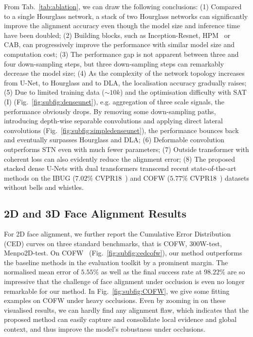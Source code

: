 \documentclass{bmvc2k}
\begin{document}
From Tab.~\ref{tab:ablation}, we can draw the following conclusions: (1) Compared to a single Hourglass network, a stack of two Hourglass networks can significantly improve the alignment accuracy even though the model size and inference time have been doubled; (2) Building blocks, such as Inception-Resnet, HPM~\cite{bulat2017far} or CAB, can progressively improve the performance with similar model size and computation cost; (3) The performance gap is not apparent between three and four down-sampling steps, but three down-sampling steps can remarkably decrease the model size; (4) As the complexity of the network topology increases from U-Net, to Hourglass and to DLA, the localisation accuracy gradually raises; (5) Due to limited training data ($\sim 10k$) and the optimisation difficulty with SAT (I) (Fig.~\ref{fig:subfig:denseunet}), e.g. aggregation of three scale signals, the performance obviously drops. By removing some down-sampling paths, introducing depth-wise separable convolutions and applying direct lateral convolutions (Fig.~\ref{fig:subfig:simpledenseunet}), the performance bounces back and eventually surpasses Hourglass and DLA; (6) Deformable convolution outperforms STN even with much fewer parameters; (7) Outside transformer with coherent loss can also evidently reduce the alignment error; (8) The proposed stacked dense U-Nets with dual transformers transcend recent state-of-the-art methods on the IBUG ($7.02\%$ CVPR18~\cite{feng2017wing}) and COFW ($5.77\%$ CVPR18~\cite{kumar2018disentangling}) datasets without bells and whistles.

\subsection{2D and 3D Face Alignment Results}

For 2D face alignment, we further report the Cumulative Error Distribution (CED) curves on three standard benchmarks, that is COFW, 300W-test, Menpo2D-test. On COFW~\cite{burgos2013robust} (Fig.~\ref{fig:subfig:cedcofw}), our method outperforms the baseline methods in the evaluation toolkit by a prominent margin. The normalised mean error of $5.55\%$ as well as the final success rate at $98.22\%$ are so impressive that the challenge of face alignment under occlusion is even no longer remarkable for our method. In Fig.~\ref{fig:subfig:COFW}, we give some fitting examples on COFW under heavy occlusions. Even by zooming in on these visualised results, we can hardly find any alignment flaw, which indicates that the proposed method can easily capture and consolidate local evidence and global context, and thus improve the model's robustness under occlusions.
\end{document}
